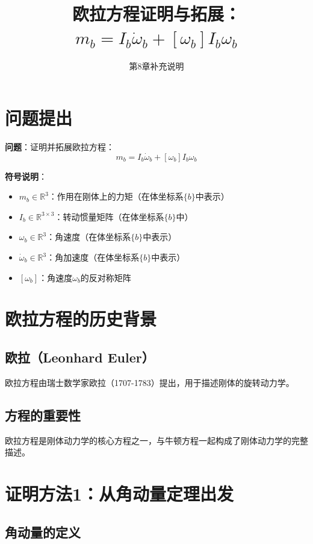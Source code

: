 \documentclass[12pt,a4paper]{article}
\title{欧拉方程证明与拓展：$m_b = I_b \dot{\omega}_b + [\omega_b] I_b \omega_b$}
\author{第8章补充说明}
\date{}
\begin{document}
\maketitle

\section{问题提出}

\textbf{问题}：证明并拓展欧拉方程：
\begin{equation}
m_b = I_b \dot{\omega}_b + [\omega_b] I_b \omega_b
\label{eq:euler_equation}
\end{equation}

\textbf{符号说明}：
\begin{itemize}
\item $m_b \in \mathbb{R}^3$：作用在刚体上的力矩（在体坐标系$\{b\}$中表示）
\item $I_b \in \mathbb{R}^{3 \times 3}$：转动惯量矩阵（在体坐标系$\{b\}$中）
\item $\omega_b \in \mathbb{R}^3$：角速度（在体坐标系$\{b\}$中表示）
\item $\dot{\omega}_b \in \mathbb{R}^3$：角加速度（在体坐标系$\{b\}$中表示）
\item $[\omega_b]$：角速度$\omega_b$的反对称矩阵
\end{itemize}

\section{欧拉方程的历史背景}

\subsection{欧拉（Leonhard Euler）}

欧拉方程由瑞士数学家欧拉（1707-1783）提出，用于描述刚体的旋转动力学。

\subsection{方程的重要性}

欧拉方程是刚体动力学的核心方程之一，与牛顿方程一起构成了刚体动力学的完整描述。

\section{证明方法1：从角动量定理出发}

\subsection{角动量的定义}
\end{document}
